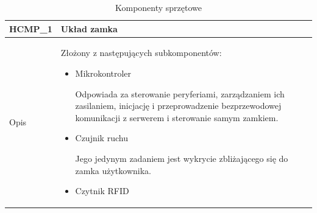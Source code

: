                 \begin{table}
                    \caption{Komponenty sprzętowe}
                    \centering
                    \begin{subtable}[c]{\textwidth}
                        \centering
                        \begin{tabular}{|p{2cm}|p{12cm}|}
                            \hline HCMP\_1      & \textbf{Układ zamka} \\
                            \hline \cellcolor[gray]{0.8} Opis         & Złożony z następujących subkomponentów:
                                                    \begin{itemize}
                                                        \item Mikrokontroler

                                                            Odpowiada za sterowanie peryferiami, zarządzaniem ich zasilaniem, inicjację i przeprowadzenie bezprzewodowej komunikacji z serwerem i sterowanie samym zamkiem.

                                                        \item Czujnik ruchu

                                                            Jego jedynym zadaniem jest wykrycie zbliżającego się do zamka użytkownika.

                                                        \item Czytnik RFID


\end{itemize}
\end{tabular}
\end{subtable}
\end{table}
